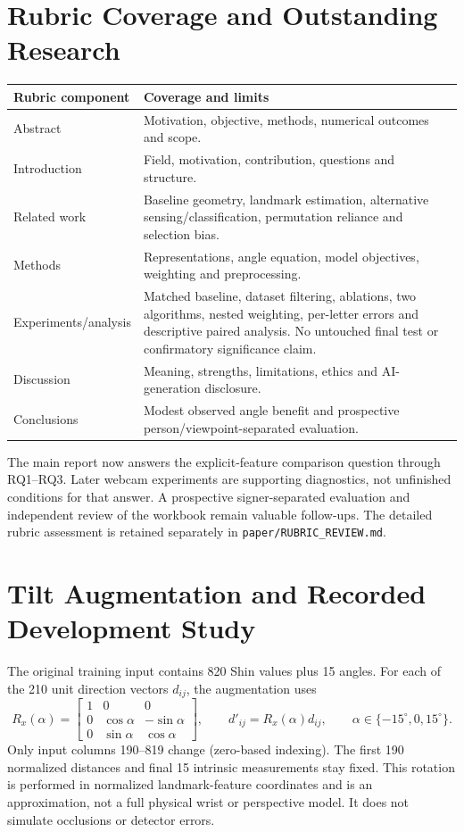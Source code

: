 \documentclass{article}
\begin{document}
\section{Rubric Coverage and Outstanding Research}
\begin{tabular}{p{.20\linewidth}p{.72\linewidth}}\toprule
Rubric component & Coverage and limits\\\midrule
Abstract & Motivation, objective, methods, numerical outcomes and scope.\\
Introduction & Field, motivation, contribution, questions and structure.\\
Related work & Baseline geometry, landmark estimation, alternative sensing/classification, permutation reliance and selection bias.\\
Methods & Representations, angle equation, model objectives, weighting and preprocessing.\\
Experiments/analysis & Matched baseline, dataset filtering, ablations, two algorithms, nested weighting, per-letter errors and descriptive paired analysis. No untouched final test or confirmatory significance claim.\\
Discussion & Meaning, strengths, limitations, ethics and AI-generation disclosure.\\
Conclusions & Modest observed angle benefit and prospective person/viewpoint-separated evaluation.\\\bottomrule\end{tabular}

The main report now answers the explicit-feature comparison question through RQ1--RQ3. Later webcam experiments are supporting diagnostics, not unfinished conditions for that answer. A prospective signer-separated evaluation and independent review of the workbook remain valuable follow-ups. The detailed rubric assessment is retained separately in \texttt{paper/RUBRIC\_REVIEW.md}.

\clearpage


\section{Tilt Augmentation and Recorded Development Study}
The original training input contains 820 Shin values plus 15 angles. For each of the 210 unit direction vectors $d_{ij}$, the augmentation uses
\[
R_x(\alpha)=\begin{bmatrix}1&0&0\\0&\cos\alpha&-\sin\alpha\\0&\sin\alpha&\cos\alpha\end{bmatrix},
\qquad d'_{ij}=R_x(\alpha)d_{ij},\qquad \alpha\in\{-15^\circ,0,15^\circ\}.
\]
Only input columns 190--819 change (zero-based indexing). The first 190 normalized distances and final 15 intrinsic measurements stay fixed. This rotation is performed in normalized landmark-feature coordinates and is an approximation, not a full physical wrist or perspective model. It does not simulate occlusions or detector errors.
\end{document}
